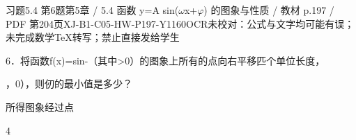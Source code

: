\begin{bankitem}{习题5.4 第6题}{第5章 / 5.4 函数 y=A sin(\ensuremath{\omega}x+\ensuremath{\varphi}) 的图象与性质 / 教材 p.197 / PDF 第204页}{XJ-B1-C05-HW-P197-Y1160}{OCR未校对：公式与文字均可能有误；未完成数学TeX转写；禁止直接发给学生}
\begin{ocrdraft}
\par
6．将函数f(x)=sin-（其中>0）的图象上所有的点向右平移匹个单位长度，
\par
，0），则仞的最小值是多少？
\par
所得图象经过点
\par
4
\end{ocrdraft}
\end{bankitem}
